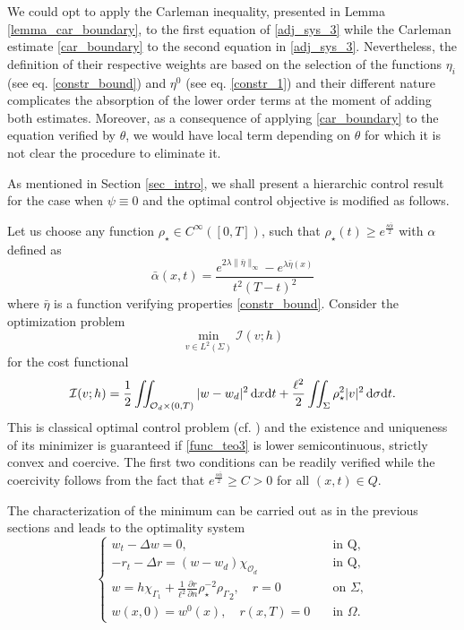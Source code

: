 \documentclass[preprint,10pt]{article}
\numberwithin{equation}{section}
\numberwithin{theorem}{section}
\def\dx{\,\textnormal{d}x}
\def\dt{\textnormal{d}t}
\def\d{\,\textnormal{d}}
\def\csbd{\rho_{\Gamma}}
\newcommand\csin[1]{\chi_{#1}}
\def\dx{\,\textnormal{d}x}
\def\dt{\textnormal{d}t}
\def\d{\,\textnormal{d}}
\newcommand\magenta[1]{{\color{magenta} #1}}
\begin{document}
{We could opt to apply the Carleman inequality, presented in Lemma \ref{lemma_car_boundary}, to the first equation of \eqref{adj_sys_3} while the Carleman estimate \eqref{car_boundary} to the second equation in \eqref{adj_sys_3}. Nevertheless, the definition of their respective weights are based on the selection of the functions $\eta_i$ (see eq. \eqref{constr_bound}) and $\eta^0$ (see eq. \eqref{constr_1}) and their different nature complicates the absorption of the lower order terms at the moment of adding both estimates. Moreover, as a consequence of applying \eqref{car_boundary} to the equation verified by $\theta$, we would have local term depending on $\theta$ for which it is not clear the procedure to eliminate it. 

As mentioned in Section \ref{sec_intro}, we shall present a hierarchic control result for the case when $\psi\equiv 0$ and the optimal control objective is modified as follows. 

Let us choose any function $\rho_\star\in C^\infty([0,T])$, such that $\rho_\star(t)\geq e^{\frac{s\bar\alpha}{2}}$ with $\alpha$ defined as
%
\begin{equation*}
\bar\alpha(x,t)=\frac{e^{2\lambda\|\bar\eta\|_{\infty}}-e^{\lambda\bar\eta(x)}}{t^2(T-t)^2}
\end{equation*}
%
where $\bar\eta$ is a function verifying properties \eqref{constr_bound}. 
%
%
Consider the optimization problem
%
\begin{equation*}
\min_{v\in L^2(\Sigma)} \mathcal I(v;h)
\end{equation*}
%
for the cost functional
%
\begin{equation*}%
\mathcal I(v;h)=\frac{1}{2}\iint_{\mathcal O_d\times(0,T)}|w-w_d|^2\dx\dt+\frac{\ell^2}{2}\iint_{\Sigma}\rho_\star^2|v|^2\d\sigma\dt.
\end{equation*}
%
This is classical optimal control problem (cf. \cite{Lions_optim}) and the existence and uniqueness of its minimizer is  guaranteed if \eqref{func_teo3} is lower semicontinuous, strictly convex and coercive. The first two conditions can be readily verified while the coercivity follows from the fact that $e^{\frac{s\bar\alpha}{2}}\geq C>0$ for all $(x,t)\in Q$. 

The characterization of the minimum can be carried out as in the previous sections and leads to the optimality system
%
\begin{equation*}%
\begin{cases}
w_t-\Delta w=0, &\quad  \text{in Q}, \\
-r_t-\Delta r= (w-w_d)\chi_{\mathcal O_d}  &\quad  \text{in Q},\\ 
w=h\csin{\Gamma_1}+ \frac{1}{\ell^2}\frac{\partial r}{\partial n}\rho_\star^{-2}{\csbd}_2, \quad r=0 &\quad \text{on } \Sigma, \\
w(x,0)=w^0(x),\quad r(x,T)=0 &\quad \text{in } \Omega.
\end{cases}
\end{equation*}

}
\end{document}
